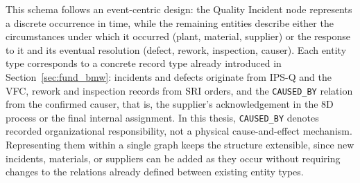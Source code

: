 This schema follows an event-centric design: the Quality Incident node
represents a discrete occurrence in time, while the remaining entities
describe either the circumstances under which it occurred (plant,
material, supplier) or the response to it and its eventual resolution
(defect, rework, inspection, causer). Each entity type corresponds to a
concrete record type already introduced in Section~\ref{sec:fund_bmw}:
incidents and defects originate from IPS-Q and the VFC, rework and
inspection records from SRI orders, and the \texttt{CAUSED\_BY} relation
from the confirmed causer, that is, the supplier's acknowledgement in the
8D process or the final internal assignment. In this thesis,
\texttt{CAUSED\_BY} denotes recorded organizational responsibility, not a
physical cause-and-effect mechanism. Representing them within a single
graph keeps the structure extensible, since new incidents, materials, or
suppliers can be added as they occur without requiring changes to the
relations already defined between existing entity types.


